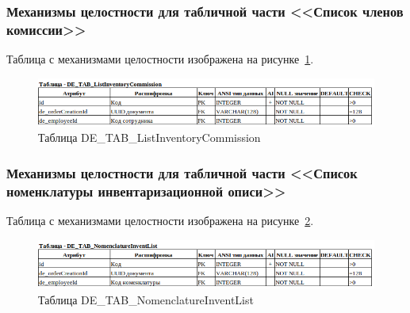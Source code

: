 
\subsubsection{Механизмы целостности для табличной части <<Список членов комиссии>>}

Таблица с механизмами целостности изображена на рисунке~\ref{fig:Logic_DE_TAB_ListInventoryCommission}.

\begin{figure}[!h]
    \centering

    \includegraphics[width=18cm]
    {assets/database/Types/DE_TAB_ListInventoryCommission.png}

    \caption{Таблица DE\_TAB\_ListInventoryCommission}

    \label{fig:Logic_DE_TAB_ListInventoryCommission}
\end{figure}


\subsubsection{Механизмы целостности для табличной части <<Список номенклатуры инвентаризационной описи>>}

Таблица с механизмами целостности изображена на рисунке~\ref{fig:Logic_DE_TAB_NomenclatureInventList}.

\begin{figure}[!h]
    \centering

    \includegraphics[width=18cm]
    {assets/database/Types/DE_TAB_NomenclatureInventList.png}

    \caption{Таблица DE\_TAB\_NomenclatureInventList}

    \label{fig:Logic_DE_TAB_NomenclatureInventList}
\end{figure}


